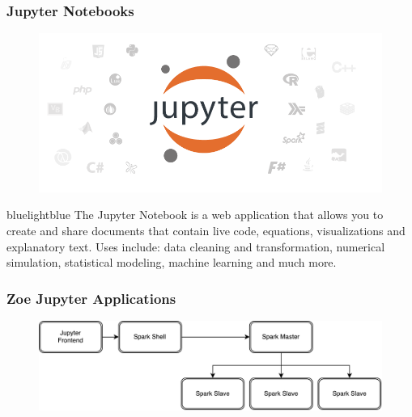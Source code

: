 \begin{frame}\frametitle{Jupyter Notebooks}

	\begin{figure}
		\includegraphics[width=0.45\linewidth]{figures/jupyter}
	\end{figure}

	\begin{colorblock}{blue}{lightblue}{ }
   The Jupyter Notebook is a web application that allows you to create and share documents that contain live code, equations, visualizations and explanatory text. Uses include: data cleaning and transformation, numerical simulation, statistical modeling, machine learning and much more.
   \end{colorblock}
\end{frame}

\begin{frame}\frametitle{Zoe Jupyter Applications}
	\begin{figure}
		\includegraphics[scale=0.5]{figures/jupyter_app}
	\end{figure}
\end{frame}

